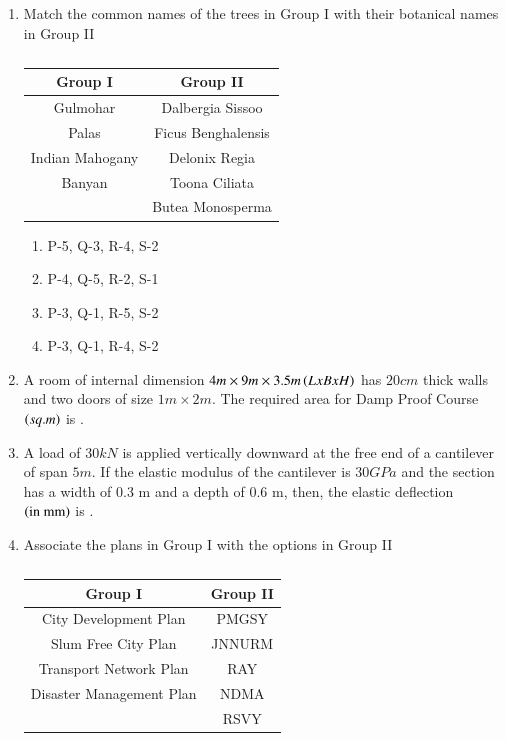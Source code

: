 \documentclass[journal,12pt,onecolumn]{IEEEtran}
\theoremstyle{remark}
\begin{document}
\begin{enumerate}
\item Match the common names of the trees in Group I with their botanical names in Group II

\begin{table}[H]
\centering
\begin{tabular}{c|c}
Group I & Group II \\
\hline
Gulmohar & Dalbergia Sissoo \\
Palas & Ficus Benghalensis \\
Indian Mahogany & Delonix Regia \\
Banyan & Toona Ciliata \\
 & Butea Monosperma \\
 \end{tabular}
 \caption*{}
 \label{Q.50}
 \end{table}

\hfill{}
\begin{enumerate}
\item P-5, Q-3, R-4, S-2
\item P-4, Q-5, R-2, S-1
\item P-3, Q-1, R-5, S-2
\item P-3, Q-1, R-4, S-2
\end{enumerate}

\item A room of internal dimension $4m \times 9m \times 3.5m \brak{LxBxH}$ has $20 cm$ thick walls and two doors of size $1m \times 2m$. The required area for Damp Proof Course $\brak{sq.m}$ is \underline{\hspace{3cm}}.

\hfill{}

\item A load of $30 kN$ is applied vertically downward at the free end of a cantilever of span $5 m$. If the elastic modulus of the cantilever is $30 GPa$ and the section has a width of 0.3 m and a depth of 0.6 m, then, the elastic deflection $\brak{\text{in mm}}$ is \underline{\hspace{3cm}}.

\hfill{}

\item Associate the plans in Group I with the options in Group II

\begin{table}[H]
\centering
\begin{tabular}{c|c}
Group I & Group II \\
\hline
City Development Plan & PMGSY \\
Slum Free City Plan & JNNURM \\
Transport Network Plan & RAY \\
Disaster Management Plan & NDMA \\
 & RSVY \\
\end{tabular}
\caption*{}
\label{Q.53}
\end{table}


\end{enumerate}
\end{document}
